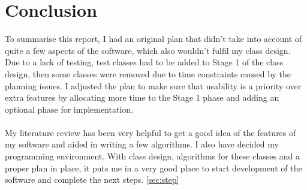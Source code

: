 \documentclass[final]{cmpreport}
\begin{document}
	\section{Conclusion}
	To summarise this report, I had an original plan that didn't take into account of quite a few aspects of the software, which also wouldn't fulfil my class design. Due to a lack of testing, test classes had to be added to Stage 1 of the class design, then some classes were removed due to time constraints caused by the planning issues. I adjusted the plan to make sure that usability is a priority over extra features by allocating more time to the Stage 1 phase and adding an optional phase for implementation.\\
	\\My literature review has been very helpful to get a good idea of the features of my software and aided in writing a few algorithms. I also have decided my programming environment. With class design, algorithms for these classes and a proper plan in place, it puts me in a very good place to start development of the software and complete the next steps. \ref{sec:step}\\

	\newpage
\end{document}
